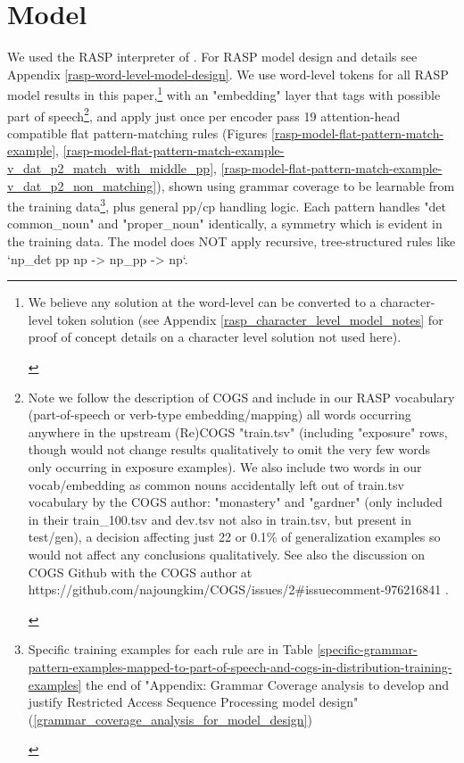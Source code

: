 \documentclass[11pt]{article}
\begin{document}
\section{Model}
\label{model}

We used the RASP interpreter of \cite{Weiss2021}. For RASP model design and details see Appendix \ref{rasp-word-level-model-design}. We use word-level tokens for all RASP model results in this paper,\footnote{\begin{footnotesize}We believe any solution at the word-level can be converted to a character-level token solution (see Appendix \ref{rasp_character_level_model_notes} for proof of concept details on a character level solution not used here).
\end{footnotesize}
}
with an "embedding" layer that tags with possible part of speech\footnote{\begin{footnotesize}Note we follow the \cite{klinger2024compositionalprogramgenerationfewshot} description of COGS and include in our RASP vocabulary (part-of-speech or verb-type embedding/mapping) all words occurring anywhere in the upstream (Re)COGS "train.tsv" (including "exposure" rows, though would not change results qualitatively to omit the very few words only occurring in exposure examples). We also include two words in our vocab/embedding as common nouns accidentally left out of train.tsv vocabulary by the COGS author: "monastery" and "gardner" (only included in their train\_100.tsv and dev.tsv not also in train.tsv, but present in test/gen), a decision affecting just 22 or 0.1\% of generalization examples so would not affect any conclusions qualitatively. See also the discussion on COGS Github with the COGS author at https://github.com/najoungkim/COGS/issues/2\#issuecomment-976216841 .\end{footnotesize}}, and apply just once per encoder pass 19 attention-head compatible flat pattern-matching rules (Figures \ref{rasp-model-flat-pattern-match-example}, \ref{rasp-model-flat-pattern-match-example-v_dat_p2_match_with_middle_pp}, \ref{rasp-model-flat-pattern-match-example-v_dat_p2_non_matching}), shown using grammar coverage \cite{fuzzingbook2023:GrammarCoverageFuzzer} to be learnable from the training data\footnote{\begin{footnotesize}Specific training examples for each rule are in Table \ref{specific-grammar-pattern-examples-mapped-to-part-of-speech-and-cogs-in-distribution-training-examples} the end of "Appendix: Grammar Coverage analysis to develop and justify Restricted Access Sequence Processing model design" (\ref{grammar_coverage_analysis_for_model_design})\end{footnotesize}}, plus general pp/cp handling logic. Each pattern handles "det common\_noun" and "proper\_noun" identically, a symmetry which is evident in the training data. The model does NOT apply recursive, tree-structured rules like `np\_det pp np -> np\_pp -> np`.
\end{document}
